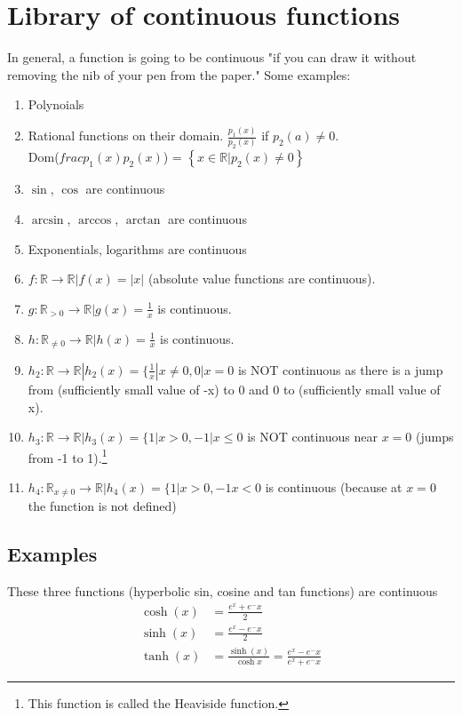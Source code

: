 \section{Library of continuous functions}
In general, a function is going to be continuous "if you can draw it without
removing the nib of your pen from the paper." Some examples:
\begin{enumerate}
  \item Polynoials
  \item Rational functions on their domain. $\frac{p_1(x)}{p_2(x)}$ if $p_2(a) \neq 0$. \\
  Dom($frac{p_1(x)}{p_2(x)}$) = $\left\{ x \in \mathbb{R} | p_2(x) \neq 0\right\}$
  \item $\sin$, $\cos$ are continuous
  \item $\arcsin$, $\arccos$, $\arctan$ are continuous
  \item Exponentials, logarithms are continuous
  \item $f: \mathbb{R} \to \mathbb{R} | f(x) = |x|$ (absolute value functions
  are continuous).
  \item $g: \mathbb{R}_{>0} \to \mathbb{R} | g(x) = \frac{1}{x}$ is continuous.
  \item $h: \mathbb{R}_{\neq 0} \to \mathbb{R} | h(x) = \frac{1}{x}$ is continuous.
  \item $h_2: \mathbb{R} \to \mathbb{R} | h_2(x) = \{ \frac{1}{x} | x \neq 0 , 0 | x = 0$ is NOT continuous
  as there is a jump from (sufficiently small value of -x) to 0 and 0 to (sufficiently small value of x).
  \item $h_3: \mathbb{R} \to \mathbb{R} | h_3(x) = \{ 1 | x > 0, -1 | x \leq 0$
  is NOT continuous near $x=0$ (jumps from -1 to 1).\footnote{This function is called the Heaviside function.}
  \item $h_4: \mathbb{R}_{x \neq 0} \to \mathbb{R} | h_4(x) = \{ 1 | x > 0, -1 x < 0$ is continuous
  (because at $x=0$ the function is not defined)
\end{enumerate}

\subsection{Examples}
These three functions (hyperbolic sin, cosine and tan functions) are continuous
\begin{align}
  \cosh(x) &= \frac{e^x + e^-x}{2} \\
  \sinh(x) &= \frac{e^x - e^-x}{2} \\
  \tanh(x) &= \frac{\sinh(x)}{\cosh{x}} = \frac{e^x - e^-x}{e^x + e^-x}
\end{align}


